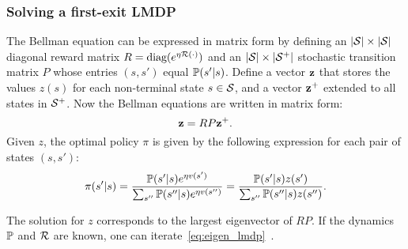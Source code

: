 \subsubsection{Solving a first-exit LMDP}
The Bellman equation can be expressed in matrix form by defining an $\lvert\mathcal{S}\rvert\times\lvert\mathcal{S}\rvert$ diagonal reward matrix $R=\text{diag}(e^{\eta\mathcal{R}(\cdot)})$ and an $\lvert\mathcal{S}\rvert\times \lvert\mathcal{S}^+\rvert$ stochastic transition matrix $P$ whose entries $(s,s')$ equal $\mathbb{P}(s'|s)$. Define a vector $\bf z$ that stores the values $z(s)$ for each non-terminal state $s\in\mathcal{S}$, and a vector $\bf z^+$ extended to all states in $\mathcal{S}^+$. Now the Bellman equations are written in matrix form:
\begin{equation}\label{eq:eigen_lmdp}
{\bf z} = R P {\bf z^+}.
\end{equation}
Given $z$, the optimal policy $\pi$ is given by the following expression for each pair of states $(s,s')$:
\begin{equation}
\label{eq:lmdp_optimal_policy}
\pi(s'|s) =  \frac {\mathbb{P}(s'|s) e^{\eta v(s')} } {\sum_{s''} \mathbb{P}(s''|s) e^{\eta v(s'')} } = \frac {\mathbb{P}(s'|s)z(s')} {\sum_{s''} \mathbb{P}(s''|s)z(s'')}.
\end{equation}

The solution for $z$ corresponds to the largest eigenvector of $RP$.
If the dynamics $\mathbb{P}$ and $\mathcal{R}$ are known, one can iterate~\eqref{eq:eigen_lmdp}~\citep{Todorov2006}.

